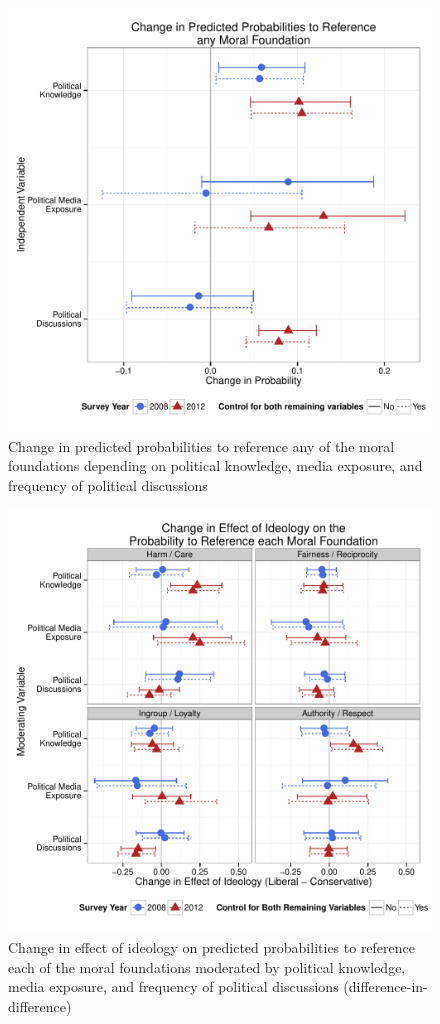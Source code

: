 \documentclass[12pt]{article}
\begin{document}
\begin{figure}\centering
\includegraphics[scale=.4]{../calc/fig/appD7learn.pdf}
\caption{Change in predicted probabilities to reference any of the moral foundations depending on political knowledge, media exposure, and frequency of political discussions}\label{fig:appD7learn}
\end{figure}

\begin{figure}\centering
\includegraphics[scale=.4]{../calc/fig/appD8ideolearn.pdf}
\caption{Change in effect of ideology on predicted probabilities to reference each of the moral foundations moderated by political knowledge, media exposure, and frequency of political discussions (difference-in-difference)}\label{fig:appD8ideolearn}
\end{figure}
\end{document}
